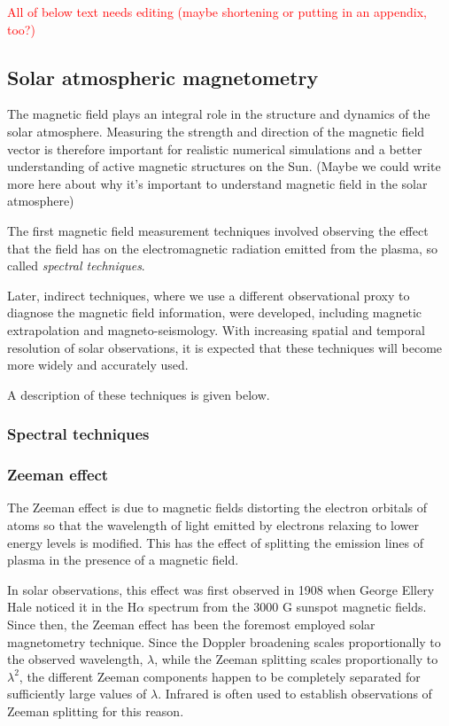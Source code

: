 \documentclass[12pt]{../style-files/ociamthesis}
\begin{document}
\textcolor{red}{All of below text needs editing (maybe shortening or putting in an appendix, too?)}
\subsection{Solar atmospheric magnetometry}
The magnetic field plays an integral role in the structure and dynamics of the solar atmosphere. Measuring the strength and direction of the magnetic field vector is therefore important for realistic numerical simulations and a better understanding of active magnetic structures on the Sun. (Maybe we could write more here about why it's important to understand magnetic field in the solar atmosphere)

The first magnetic field measurement techniques involved observing the effect that the field has on the electromagnetic radiation emitted from the plasma, so called \textit{spectral techniques}.

Later, indirect techniques, where we use a different observational proxy to diagnose the magnetic field information, were developed, including magnetic extrapolation and magneto-seismology. With increasing spatial and temporal resolution of solar observations, it is expected that these techniques will become more widely and accurately used.

A description of these techniques is given below.

\subsubsection{Spectral techniques}
\subsubsection{Zeeman effect}
The Zeeman effect is due to magnetic fields distorting the electron orbitals of atoms so that the wavelength of light emitted by electrons relaxing to lower energy levels is modified. This has the effect of splitting the emission lines of plasma in the presence of a magnetic field.

In solar observations, this effect was first observed in 1908 when George Ellery Hale noticed it in the H$\alpha$ spectrum from the 3000 G sunspot magnetic fields. Since then, the Zeeman effect has been the foremost employed solar magnetometry  technique. Since the Doppler broadening scales proportionally to the observed wavelength, $\lambda$, while the Zeeman splitting scales proportionally to $\lambda^2$, the different Zeeman components happen to be completely separated for sufficiently large values of $\lambda$. Infrared is often used to establish observations of Zeeman splitting for this reason.
\end{document}
